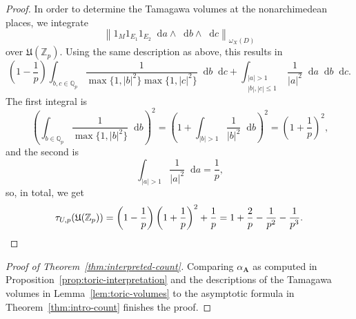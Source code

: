 \documentclass[a4paper, twoside, 10pt]{amsart}
\newcommand*\diff{\mathop{}\!\mathrm{d}}
\newcommand{\uA}{{\boldsymbol{A}}}
\newcommand{\mU}{\mathfrak{U}}
\newcommand{\ZZ}{\mathbb{Z}}
\newcommand{\QQ}{\mathbb{Q}}
\newcommand{\abs}[1]{\left\lvert#1\right\rvert}
\newcommand{\norm}[1]{\left\lVert#1\right\rVert}
\theoremstyle{definition}
\begin{document}
\begin{proof}
  In order to determine the Tamagawa volumes at the nonarchimedean places, we integrate
  \[
    \norm{1_M 1_{E_1} 1_{E_2} \diff a \wedge \diff b \wedge \diff c}_{\omega_X(D)}
  \]
  over $\mU(\ZZ_p)$.
  Using the same description as above, this results in
  \[
    \left(1-\frac{1}{p}\right)
    \int_{b,c\in\QQ_p}
    \frac{1}{\max\{1,\abs{b}^2\}\max\{1,\abs{c}^2\}} \diff b \diff c
    + \int_{\substack{\abs{a}>1\\ \abs{b},\abs{c}\le 1 }} \frac{1}{\abs{a}^2} \diff a\diff b \diff c.
  \]
  The first integral is
  \[
    \left(\int_{b\in\QQ_p} \frac{1}{\max\{1,\abs{b}^2\}} \diff b\right)^2
    = \left(1 + \int_{\abs{b}>1} \frac{1}{\abs{b}^2} \diff b\right)^2
    = \left(1+\frac{1}{p}\right)^2\text{,}
  \]
  and the second is
  \[
    \int_{\abs{a}>1} \frac{1}{\abs{a}^2} \diff a = \frac{1}{p} \text{,}
  \]
  so, in total, we get
  \[
    \tau_{U,p}(\mU(\ZZ_p)) = \left(1-\frac{1}{p}\right)\left(1+\frac{1}{p}\right)^2  + \frac{1}{p}= 1+\frac{2}{p} - \frac{1}{p^2} - \frac{1}{p^3}\text{.} \qedhere
  \]
\end{proof}

\begin{proof}[Proof of Theorem~\ref{thm:interpreted-count}]
  Comparing $\alpha_\uA$ as computed in Proposition~\ref{prop:toric-interpretation} and the descriptions of the Tamagawa volumes in Lemma~\ref{lem:toric-volumes} to the asymptotic formula in Theorem~\ref{thm:intro-count} finishes the proof.
\end{proof}




\end{document}
